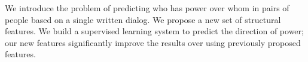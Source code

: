 We introduce the problem of predicting who has power over whom in pairs of people based on a single written dialog. We propose a new set of structural features. We build a supervised learning system to predict the direction of power; our new features significantly improve the results over using previously proposed features.

